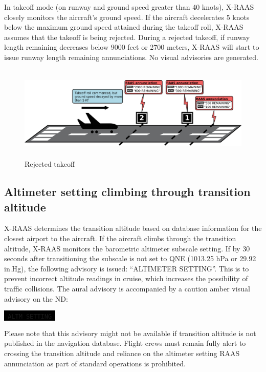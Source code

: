 \documentclass[a4paper,12pt]{article}
\newcommand{\visualadvisory}[3][b]{%
    \ifthenelse{\equal{#1}{b}}{\begin{center}}{}
    \noindent
    \colorbox{black}{\textcolor{#2visualadvisorycolor}{\large\texttt{~#3~}}}
    \ifthenelse{\equal{#1}{b}}{\end{center}}{}}
\begin{document}
In takeoff mode (on runway and ground speed greater than 40 knots),
X-RAAS closely monitors the aircraft's ground speed. If the aircraft
decelerates 5 knots below the maximum ground speed attained during the
takeoff roll, X-RAAS assumes that the takeoff is being rejected. During a
rejected takeoff, if runway length remaining decreases below 9000 feet or
2700 meters, X-RAAS will start to issue runway length remaining
annunciations.  No visual advisories are generated.

\begin{figure}[H]
\begin{center}
\includegraphics[height=4.5cm]{../src/takeoff_rejected.pdf}
\end{center}
\caption{Rejected takeoff}
\end{figure}

\newpage
\subsection{Altimeter setting climbing through transition altitude}
\label{subsec:AltmQNEMon}

X-RAAS determines the transition altitude based on database information
for the closest airport to the aircraft. If the aircraft climbs through
the transition altitude, X-RAAS monitors the barometric altimeter
subscale setting. If by 30 seconds after transitioning the subscale is
not set to QNE (1013.25 hPa or 29.92 in.Hg), the following advisory is
issued: ``ALTIMETER SETTING''. This is to prevent incorrect altitude
readings in cruise, which increases the possibility of traffic
collisions. The aural advisory is accompanied by a caution amber visual
advisory on the ND:

\visualadvisory{nonroutine}{ALTM SETTING}

\noindent Please note that this advisory might not be available if
transition altitude is not published in the navigation database. Flight
crews must remain fully alert to crossing the transition altitude and
reliance on the altimeter setting RAAS annunciation as part of standard
operations is prohibited.
\end{document}
